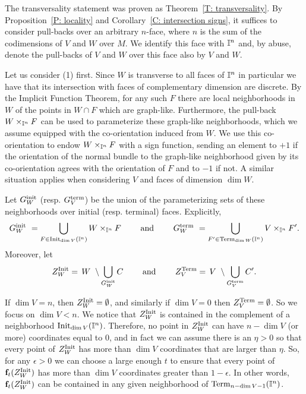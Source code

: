 The transversality statement was proven as Theorem~\ref{T: transversality}.
By Proposition~\ref{P: locality} and Corollary~\ref{C: intersection signs}, it suffices to consider pull-backs over an arbitrary $n$-face, where $n$ is the sum of the codimensions of $V$ and $W$ over $M$.
We identify this face with $\mathbb{I}^n$ and, by abuse, denote the pull-backs of $V$ and $W$ over this face also by $V$ and $W$. 

Let us consider (1) first.
Since $W$ is transverse to all faces of $\mathbb{I}^n$ in particular we have that its intersection with faces of complementary dimension are discrete.
By the Implicit Function Theorem, for any such $F$ there are local neighborhoods in $W$ of the points in $W \cap F$ which are graph-like.
Furthermore, the pull-back $W \times_{\mathbb{I}^n} F$ can be used to parameterize these graph-like neighborhoods, which we assume equipped with the co-orientation induced from $W$.
We use this co-orientation to endow $W \times_{\mathbb{I}^n} F$ with a sign function,
sending an element to $+1$ if the orientation of the normal bundle to the graph-like neighborhood given by its co-orientation agrees 
with the orientation of $F$ and to $-1$ if not.
A similar situation applies when considering $V$ and faces of dimension $\dim W$.

Let $G^{\mathrm{init}}_W$ (resp. $G^{\mathrm{term}}_V$) be the union of the parameterizing sets of these neighborhoods over initial (resp. terminal) faces. Explicitly, 
\begin{equation*}
G^{\mathrm{init}}_W\ =
\bigcup_{F \in {\rm Init}_{\dim V}(\mathbb{I}^n)} W \times_{\mathbb{I}^n} F
\qquad \text{ and } \qquad
G^{\mathrm{term}}_W\ =
\bigcup_{F^\prime \in {\rm Term}_{\dim W}(\mathbb{I}^n)} V \times_{\mathbb{I}^n} F^\prime.
\end{equation*}
Moreover, let
\begin{equation*}
Z_W^{\rm Init} =\, W\ \setminus \bigcup_{G^{\mathrm{init}}_W} C
\qquad \text{ and } \qquad
Z_V^{\rm Term} =\, V\ \setminus \bigcup_{G^{\mathrm{term}}_V} C^\prime.
\end{equation*}

If $\dim V=n$, then $Z_W^{\rm Init}=\emptyset$, and similarly if $\dim V=0$ then $Z_V^{\rm Term}=\emptyset$. 
So we focus on $\dim V<n$.
We notice that $Z_W^{\rm Init}$ is contained in the complement of a neighborhood ${\rm Init}_{\dim V}(\mathbb{I}^n)$. 
Therefore, no point in $Z_W^{\rm Init}$ can have $n-\dim V$ (or more) coordinates equal to $0$, and in fact we can assume there is an $\eta>0$ 
so that every point of $Z_W^{\rm Init}$ has more than $\dim V$ coordinates that are larger than $\eta$. 
So, for any $\epsilon>0$ we can choose a large enough $t$ to ensure that every point of $\mathbf{f}_t(Z_W^{\rm Init})$ has more than $\dim V$ coordinates greater than 
$1-\epsilon$. In other words, $\mathbf{f}_t(Z_W^{\rm Init})$ can be contained in any given neighborhood of ${\rm Term}_{n-\dim V-1}(\mathbb{I}^n)$. 

